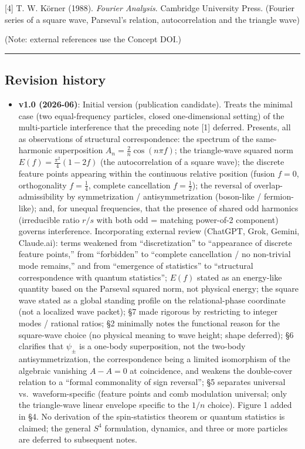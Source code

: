 \documentclass[
]{article}
\providecommand{\tightlist}{%
  \setlength{\itemsep}{0pt}\setlength{\parskip}{0pt}}
\begin{document}
{[}4{]} T. W. Körner (1988). \emph{Fourier Analysis}. Cambridge
University Press. (Fourier series of a square wave, Parseval's relation,
autocorrelation and the triangle wave)

(Note: external references use the Concept DOI.)

\begin{center}\rule{0.5\linewidth}{0.5pt}\end{center}

\subsection{Revision history}\label{revision-history}

\begin{itemize}
\tightlist
\item
  \textbf{v1.0 (2026-06)}: Initial version (publication candidate).
  Treats the minimal case (two equal-frequency particles, closed
  one-dimensional setting) of the multi-particle interference that the
  preceding note {[}1{]} deferred. Presents, all as observations of
  structural correspondence: the spectrum of the same-harmonic
  superposition \(A_n=\tfrac{2}{n}\cos(n\pi f)\); the triangle-wave
  squared norm \(E(f)=\tfrac{\pi^2}{4}(1-2f)\) (the autocorrelation of a
  square wave); the discrete feature points appearing within the
  continuous relative position (fusion \(f{=}0\), orthogonality
  \(f{=}\tfrac14\), complete cancellation \(f{=}\tfrac12\)); the
  reversal of overlap-admissibility by symmetrization /
  antisymmetrization (boson-like / fermion-like); and, for unequal
  frequencies, that the presence of shared odd harmonics (irreducible
  ratio \(r/s\) with both odd = matching power-of-2 component) governs
  interference. Incorporating external review (ChatGPT, Grok, Gemini,
  Claude.ai): terms weakened from ``discretization'' to ``appearance of
  discrete feature points,'' from ``forbidden'' to ``complete
  cancellation / no non-trivial mode remains,'' and from ``emergence of
  statistics'' to ``structural correspondence with quantum statistics'';
  \(E(f)\) stated as an energy-like quantity based on the Parseval
  squared norm, not physical energy; the square wave stated as a global
  standing profile on the relational-phase coordinate (not a localized
  wave packet); §7 made rigorous by restricting to integer modes /
  rational ratios; §2 minimally notes the functional reason for the
  square-wave choice (no physical meaning to wave height; shape
  deferred); §6 clarifies that \(\psi_\pm\) is a one-body superposition,
  not the two-body antisymmetrization, the correspondence being a
  limited isomorphism of the algebraic vanishing \(A-A=0\) at
  coincidence, and weakens the double-cover relation to a ``formal
  commonality of sign reversal''; §5 separates universal
  vs.~waveform-specific (feature points and comb modulation universal;
  only the triangle-wave linear envelope specific to the \(1/n\)
  choice). Figure 1 added in §4. No derivation of the spin-statistics
  theorem or quantum statistics is claimed; the general \(S^4\)
  formulation, dynamics, and three or more particles are deferred to
  subsequent notes.
\end{itemize}
\end{document}
